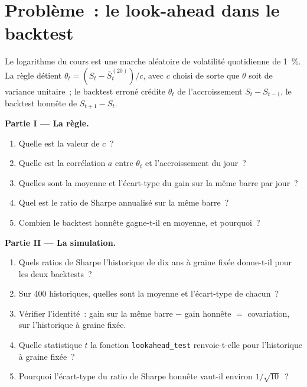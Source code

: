 \section{Problème~: le look-ahead dans le backtest}

\begin{problem}\label{pb:qm:ito-calculus:1}
Le logarithme du cours est une marche aléatoire de volatilité quotidienne de 1~\%. La règle détient $\theta_t = (S_t -
\bar S^{(20)}_t)/c$, avec $c$ choisi de sorte que $\theta$ soit de variance unitaire~; le backtest erroné crédite $\theta_t$
de l'accroissement $S_t - S_{t-1}$, le backtest honnête de $S_{t+1} - S_t$.

\medskip\noindent\textbf{Partie I --- La règle.}
\begin{enumerate}
\item Quelle est la valeur de $c$~?
\item Quelle est la corrélation $a$ entre $\theta_t$ et l'accroissement du jour~?
\item Quelles sont la moyenne et l'écart-type du gain sur la même barre par jour~?
\item Quel est le ratio de Sharpe annualisé sur la même barre~?
\item Combien le backtest honnête gagne-t-il en moyenne, et pourquoi~?
\end{enumerate}

\medskip\noindent\textbf{Partie II --- La simulation.}
\begin{enumerate}[resume]
\item Quels ratios de Sharpe l'historique de dix ans à graine fixée donne-t-il pour les deux backtests~?
\item Sur 400 historiques, quelles sont la moyenne et l'écart-type de chacun~?
\item Vérifier l'identité~: gain sur la même barre $-$ gain honnête $=$ covariation, sur l'historique à graine fixée.
\item Quelle statistique $t$ la fonction \texttt{lookahead\_test} renvoie-t-elle pour l'historique à graine fixée~?
\item Pourquoi l'écart-type du ratio de Sharpe honnête vaut-il environ $1/\sqrt{10}$~?
\end{enumerate}


\end{problem}
